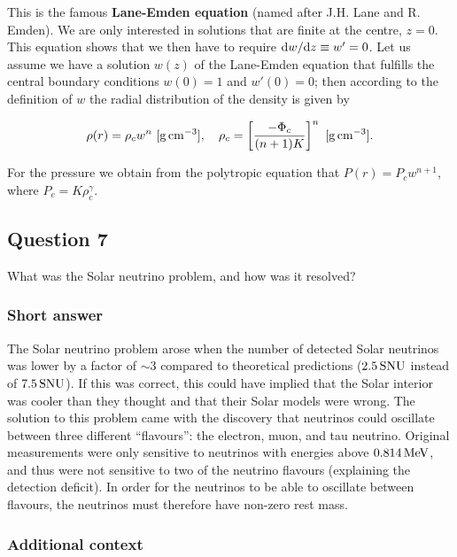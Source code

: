 \documentclass[a4paper,10pt]{article}
\begin{document}
{\noindent}This is the famous \textbf{Lane-Emden equation} (named after J.H. Lane and R. Emden). We are only interested in solutions that are finite at the centre, $z=0$. This equation shows that we then have to require ${\rm d}w/{\rm d}z\equiv w'=0$. Let us assume we have a solution $w(z)$ of the Lane-Emden equation that fulfills the central boundary conditions $w(0)=1$ and $w'(0)=0$; then according to the definition of $w$ the radial distribution of the density is given by

\begin{align*}
    \rho(r) = \rho_cw^n ~ [{\rm g\,cm^{-3}}], ~~~ \rho_c = \left[ \frac{-\Phi_c}{(n+1)K} \right]^n ~ [{\rm g\,cm^{-3}}].
\end{align*}

{\noindent}For the pressure we obtain from the polytropic equation that $P(r)=P_cw^{n+1}$, where $P_c=K\rho_c^\gamma$.


\newpage
\subsection{Question 7}

What was the Solar neutrino problem, and how was it resolved?

\subsubsection{Short answer}

The Solar neutrino problem arose when the number of detected Solar neutrinos was lower by a factor of $\sim3$ compared to theoretical predictions ($2.5\,{\rm SNU}$ instead of $7.5\,{\rm SNU}$). If this was correct, this could have implied that the Solar interior was cooler than they thought and that their Solar models were wrong. The solution to this problem came with the discovery that neutrinos could oscillate between three different ``flavours'': the electron, muon, and tau neutrino. Original measurements were only sensitive to neutrinos with energies above $0.814\,{\rm MeV}$, and thus were not sensitive to two of the neutrino flavours (explaining the detection deficit). In order for the neutrinos to be able to oscillate between flavours, the neutrinos must therefore have non-zero rest mass.

\subsubsection{Additional context}
\end{document}

